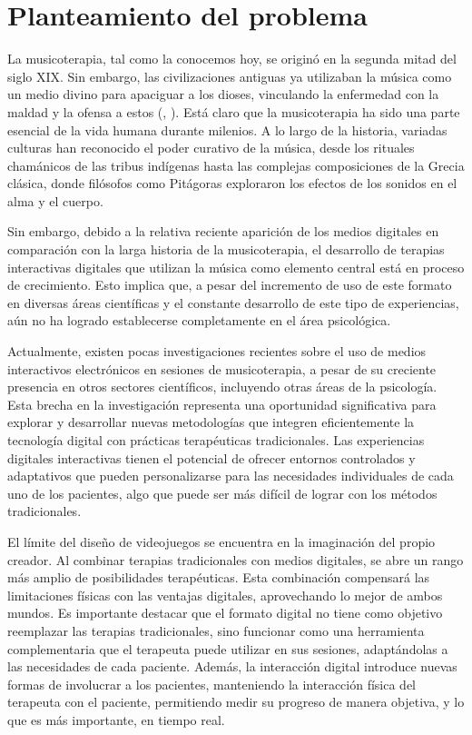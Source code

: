\newpage

\section{Planteamiento del problema}

La musicoterapia, tal como la conocemos hoy, se originó en la segunda mitad del siglo XIX. Sin embargo, las civilizaciones antiguas ya utilizaban la música como un medio divino para apaciguar a los dioses, vinculando la enfermedad con la maldad y la ofensa a estos (\citeauthor{JIPS:2001}, \citeyear{JIPS:2001}). Está claro que la musicoterapia ha sido una parte esencial de la vida humana durante milenios. A lo largo de la historia, variadas culturas han reconocido el poder curativo de la música, desde los rituales chamánicos de las tribus indígenas hasta las complejas composiciones de la Grecia clásica, donde filósofos como Pitágoras exploraron los efectos de los sonidos en el alma y el cuerpo.

Sin embargo, debido a la relativa reciente aparición de los medios digitales en comparación con la larga historia de la musicoterapia, el desarrollo de terapias interactivas digitales que utilizan la música como elemento central está en proceso de crecimiento. Esto implica que, a pesar del incremento de uso de este formato en diversas áreas científicas y el constante desarrollo de este tipo de experiencias, aún no ha logrado establecerse completamente en el área psicológica.

Actualmente, existen pocas investigaciones recientes sobre el uso de medios interactivos electrónicos en sesiones de musicoterapia, a pesar de su creciente presencia en otros sectores científicos, incluyendo otras áreas de la psicología. Esta brecha en la investigación representa una oportunidad significativa para explorar y desarrollar nuevas metodologías que integren eficientemente la tecnología digital con prácticas terapéuticas tradicionales. Las experiencias digitales interactivas tienen el potencial de ofrecer entornos controlados y adaptativos que pueden personalizarse para las necesidades individuales de cada uno de los pacientes, algo que puede ser más difícil de lograr con los métodos tradicionales.

El límite del diseño de videojuegos se encuentra en la imaginación del propio creador. Al combinar terapias tradicionales con medios digitales, se abre un rango más amplio de posibilidades terapéuticas. Esta combinación compensará las limitaciones físicas con las ventajas digitales, aprovechando lo mejor de ambos mundos. Es importante destacar que el formato digital no tiene como objetivo reemplazar las terapias tradicionales, sino funcionar como una herramienta complementaria que el terapeuta puede utilizar en sus sesiones, adaptándolas a las necesidades de cada paciente. Además, la interacción digital introduce nuevas formas de involucrar a los pacientes, manteniendo la interacción física del terapeuta con el paciente, permitiendo medir su progreso de manera objetiva, y lo que es más importante, en tiempo real.

